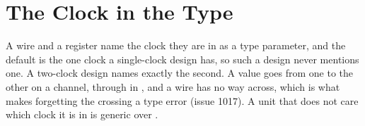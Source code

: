\section{The Clock in the Type}
\label{sec:x-clock}

A wire and a register name the clock they are in as a type parameter,
and the default is the one clock a single-clock design has, so such a
design never mentions one. A two-clock design names exactly the second.
A value goes from one to the other on a channel, through
 in , and a wire has no way across,
which is what makes forgetting the crossing a type error (issue 1017). A unit that does not care which
clock it is in is generic over .


